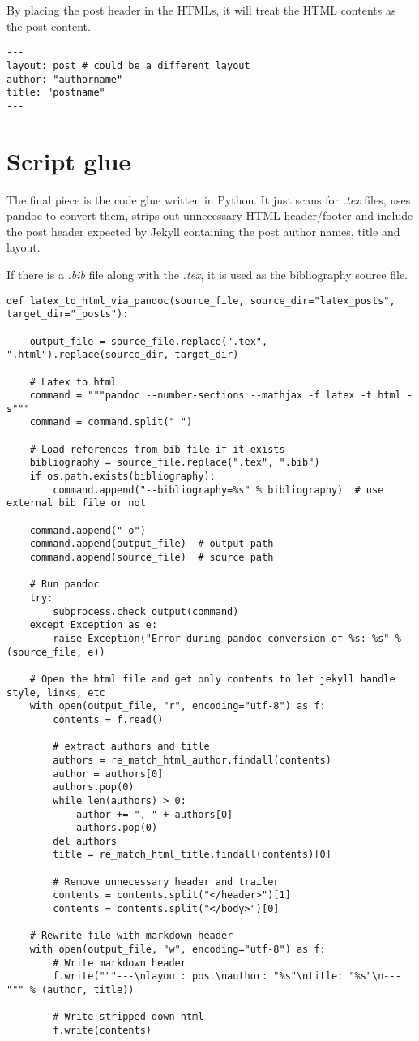\documentclass{article}
\begin{document}
By placing the post header in the HTMLs, it will treat the HTML contents as the post content.
\begin{verbatim}
---
layout: post # could be a different layout
author: "authorname"
title: "postname"
---
\end{verbatim}

\section{Script glue} \label{glue}
The final piece is the code glue written in Python.
It just scans for \textit{.tex} files, uses pandoc to convert them, strips out unnecessary HTML header/footer and
include the post header expected by Jekyll containing the post author names, title and layout.

If there is a \textit{.bib} file along with the \textit{.tex}, it is used as the bibliography source file.

\begin{verbatim}
def latex_to_html_via_pandoc(source_file, source_dir="latex_posts", target_dir="_posts"):

    output_file = source_file.replace(".tex", ".html").replace(source_dir, target_dir)

    # Latex to html
    command = """pandoc --number-sections --mathjax -f latex -t html -s"""
    command = command.split(" ")

    # Load references from bib file if it exists
    bibliography = source_file.replace(".tex", ".bib")
    if os.path.exists(bibliography):
        command.append("--bibliography=%s" % bibliography)  # use external bib file or not

    command.append("-o")
    command.append(output_file)  # output path
    command.append(source_file)  # source path

    # Run pandoc
    try:
        subprocess.check_output(command)
    except Exception as e:
        raise Exception("Error during pandoc conversion of %s: %s" % (source_file, e))

    # Open the html file and get only contents to let jekyll handle style, links, etc
    with open(output_file, "r", encoding="utf-8") as f:
        contents = f.read()

        # extract authors and title
        authors = re_match_html_author.findall(contents)
        author = authors[0]
        authors.pop(0)
        while len(authors) > 0:
            author += ", " + authors[0]
            authors.pop(0)
        del authors
        title = re_match_html_title.findall(contents)[0]

        # Remove unnecessary header and trailer
        contents = contents.split("</header>")[1]
        contents = contents.split("</body>")[0]

    # Rewrite file with markdown header
    with open(output_file, "w", encoding="utf-8") as f:
        # Write markdown header
        f.write("""---\nlayout: post\nauthor: "%s"\ntitle: "%s"\n---""" % (author, title))

        # Write stripped down html
        f.write(contents)
\end{verbatim}
\end{document}

